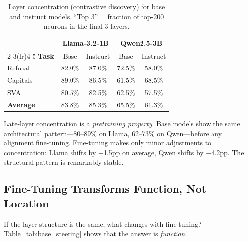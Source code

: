 \documentclass{article}
\begin{document}
\begin{table}[t]
\caption{Layer concentration (contrastive discovery) for base and instruct models. ``Top 3'' = fraction of top-200 neurons in the final 3 layers.}
\label{tab:base_vs_instruct}
\vskip 0.1in
\begin{center}
\begin{tabular}{lcccc}
\toprule
& \multicolumn{2}{c}{\textbf{Llama-3.2-1B}} & \multicolumn{2}{c}{\textbf{Qwen2.5-3B}} \\
\cmidrule(lr){2-3}\cmidrule(lr){4-5}
\textbf{Task} & Base & Instruct & Base & Instruct \\
\midrule
Refusal   & 82.0\% & 87.0\% & 72.5\% & 58.0\% \\
Capitals  & 89.0\% & 86.5\% & 61.5\% & 68.5\% \\
SVA       & 80.5\% & 82.5\% & 62.5\% & 57.5\% \\
\midrule
\textbf{Average} & 83.8\% & 85.3\% & 65.5\% & 61.3\% \\
\bottomrule
\end{tabular}
\end{center}
\end{table}

Late-layer concentration is a \emph{pretraining property}.
Base models show the same architectural pattern---80--89\% on Llama, 62--73\% on Qwen---before any alignment fine-tuning.
Fine-tuning makes only minor adjustments to concentration: Llama shifts by $+$1.5pp on average, Qwen shifts by $-$4.2pp.
The structural pattern is remarkably stable.

\subsection{Fine-Tuning Transforms Function, Not Location}
\label{sec:functional}

If the layer structure is the same, what changes with fine-tuning?
Table~\ref{tab:base_steering} shows that the answer is \emph{function}.
\end{document}
